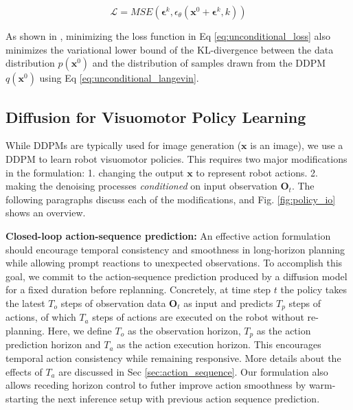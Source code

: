 \vspace{-2mm}
\begin{equation}
    \mathcal{L} = MSE(\mathbf{\epsilon}^k, \epsilon_\theta(\mathbf{x}^0+\mathbf{\epsilon}^k,k))
    \label{eq:unconditional_loss}
\end{equation}

As shown in \cite{ho2020denoising}, minimizing the loss function in Eq \ref{eq:unconditional_loss} also minimizes the variational lower bound of the KL-divergence between the data distribution $p(\mathbf{x}^0)$ and the distribution of samples drawn from the DDPM $q(\mathbf{x}^0)$ using Eq \ref{eq:unconditional_langevin}.







\subsection{Diffusion for Visuomotor Policy Learning}

While DDPMs are typically used for image generation ($\mathbf{x}$ is an image), we use a DDPM to learn robot visuomotor policies. This requires two major modifications in the formulation:
1. changing the output $\mathbf{x}$  to represent robot actions.
2. making the denoising processes \textit{conditioned} on input observation $\mathbf{O}_t$.
The following paragraphs discuss each of the modifications, and Fig. \ref{fig:policy_io} shows an overview.

\textbf{Closed-loop action-sequence prediction:}
An effective action formulation should encourage temporal consistency and smoothness in long-horizon planning while allowing prompt reactions to unexpected observations.
To accomplish this goal, we commit to the action-sequence prediction produced by a diffusion model for a fixed duration before replanning.
Concretely, at time step $t$ the policy takes the latest $T_o$ steps of observation data $\mathbf{O}_t$ as input and predicts $T_p$ steps of actions, of which $T_a$ steps of actions are executed on the robot without re-planning. Here, we define $T_o$ as the observation horizon, $T_p$ as the action prediction horizon and $T_a$ as the action execution horizon.
This encourages temporal action consistency while remaining responsive. More details about the effects of $T_a$ are discussed in Sec \ref{sec:action_sequence}.
Our formulation also allows receding horizon control \cite{mayne1988receding} to futher improve action smoothness by warm-starting the next inference setup with previous action sequence prediction.




